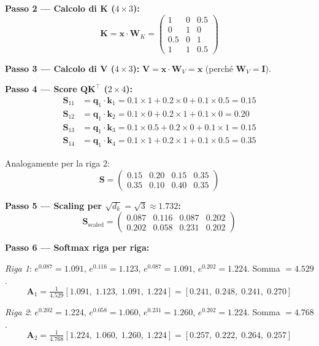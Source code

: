 \documentclass[12pt,a4paper]{article}
\begin{document}
\begin{examplebox}
\textbf{Passo 2 --- Calcolo di K ($4 \times 3$):}
\[
\mathbf{K} = \mathbf{x} \cdot \mathbf{W}_K = \begin{pmatrix} 1 & 0 & 0.5 \\ 0 & 1 & 0 \\ 0.5 & 0 & 1 \\ 1 & 1 & 0.5 \end{pmatrix}
\]

\textbf{Passo 3 --- Calcolo di V ($4 \times 3$):}
$\mathbf{V} = \mathbf{x} \cdot \mathbf{W}_V = \mathbf{x}$ (perch\'e $\mathbf{W}_V = \mathbf{I}$).

\textbf{Passo 4 --- Score $\mathbf{Q}\mathbf{K}^\top$ ($2 \times 4$):}
\begin{align*}
\mathbf{S}_{11} &= \mathbf{q}_1 \cdot \mathbf{k}_1 = 0.1 \times 1 + 0.2 \times 0 + 0.1 \times 0.5 = 0.15 \\
\mathbf{S}_{12} &= \mathbf{q}_1 \cdot \mathbf{k}_2 = 0.1 \times 0 + 0.2 \times 1 + 0.1 \times 0 = 0.20 \\
\mathbf{S}_{13} &= \mathbf{q}_1 \cdot \mathbf{k}_3 = 0.1 \times 0.5 + 0.2 \times 0 + 0.1 \times 1 = 0.15 \\
\mathbf{S}_{14} &= \mathbf{q}_1 \cdot \mathbf{k}_4 = 0.1 \times 1 + 0.2 \times 1 + 0.1 \times 0.5 = 0.35
\end{align*}

Analogamente per la riga 2:
\[
\mathbf{S} = \begin{pmatrix} 0.15 & 0.20 & 0.15 & 0.35 \\ 0.35 & 0.10 & 0.40 & 0.35 \end{pmatrix}
\]

\textbf{Passo 5 --- Scaling per $\sqrt{d_k} = \sqrt{3} \approx 1.732$:}
\[
\mathbf{S}_{\text{scaled}} = \begin{pmatrix} 0.087 & 0.116 & 0.087 & 0.202 \\ 0.202 & 0.058 & 0.231 & 0.202 \end{pmatrix}
\]

\textbf{Passo 6 --- Softmax riga per riga:}

\textit{Riga 1}: $e^{0.087} = 1.091$, $e^{0.116} = 1.123$, $e^{0.087} = 1.091$, $e^{0.202} = 1.224$. Somma $= 4.529$.
\[
\mathbf{A}_1 = \tfrac{1}{4.529}[1.091,\; 1.123,\; 1.091,\; 1.224] = [0.241,\; 0.248,\; 0.241,\; 0.270]
\]

\textit{Riga 2}: $e^{0.202} = 1.224$, $e^{0.058} = 1.060$, $e^{0.231} = 1.260$, $e^{0.202} = 1.224$. Somma $= 4.768$.
\[
\mathbf{A}_2 = \tfrac{1}{4.768}[1.224,\; 1.060,\; 1.260,\; 1.224] = [0.257,\; 0.222,\; 0.264,\; 0.257]
\]


\end{examplebox}
\end{document}
